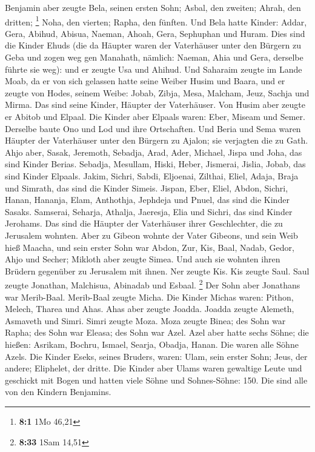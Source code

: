  Benjamin aber zeugte Bela, seinen ersten Sohn; Asbal, den
zweiten; Ahrah, den dritten; \footnote{\textbf{8:1} 1Mo 46,21}
 Noha, den vierten; Rapha, den fünften.  Und
Bela hatte Kinder: Addar, Gera, Abihud,  Abisua, Naeman,
Ahoah,  Gera, Sephuphan und Huram.  Dies
sind die Kinder Ehuds (die da Häupter waren der Vaterhäuser unter den
Bürgern zu Geba und zogen weg gen Manahath,  nämlich:
Naeman, Ahia und Gera, derselbe führte sie weg): und er zeugte Usa und
Ahihud.  Und Saharaim zeugte im Lande Moab, da er von sich
gelassen hatte seine Weiber Husim und Baara,  und er
zeugte von Hodes, seinem Weibe: Jobab, Zibja, Mesa, Malcham,
 Jeuz, Sachja und Mirma. Das sind seine Kinder, Häupter
der Vaterhäuser.  Von Husim aber zeugte er Abitob und
Elpaal.  Die Kinder aber Elpaals waren: Eber, Miseam und
Semer. Derselbe baute Ono und Lod und ihre Ortschaften. 
Und Beria und Sema waren Häupter der Vaterhäuser unter den Bürgern zu
Ajalon; sie verjagten die zu Gath.  Ahjo aber, Sasak,
Jeremoth,  Sebadja, Arad, Ader,  Michael,
Jispa und Joha, das sind Kinder Berias.  Sebadja,
Mesullam, Hiski, Heber,  Jismerai, Jislia, Jobab, das
sind Kinder Elpaals.  Jakim, Sichri, Sabdi,
 Eljoenai, Zilthai, Eliel,  Adaja, Braja
und Simrath, das sind die Kinder Simeis.  Jispan, Eber,
Eliel,  Abdon, Sichri, Hanan,  Hananja,
Elam, Anthothja,  Jephdeja und Pnuel, das sind die Kinder
Sasaks.  Samserai, Seharja, Athalja, 
Jaeresja, Elia und Sichri, das sind Kinder Jerohams.  Das
sind die Häupter der Vaterhäuser ihrer Geschlechter, die zu Jerusalem
wohnten.  Aber zu Gibeon wohnte der Vater Gibeons, und
sein Weib hieß Maacha,  und sein erster Sohn war Abdon,
Zur, Kis, Baal, Nadab,  Gedor, Ahjo und Secher;
 Mikloth aber zeugte Simea. Und auch sie wohnten ihren
Brüdern gegenüber zu Jerusalem mit ihnen.  Ner zeugte
Kis. Kis zeugte Saul. Saul zeugte Jonathan, Malchisua, Abinadab und
Esbaal. \footnote{\textbf{8:33} 1Sam 14,51}  Der Sohn
aber Jonathans war Merib-Baal. Merib-Baal zeugte Micha. 
Die Kinder Michas waren: Pithon, Melech, Tharea und Ahas.
 Ahas aber zeugte Joadda. Joadda zeugte Alemeth, Asmaveth
und Simri. Simri zeugte Moza.  Moza zeugte Binea; des
Sohn war Rapha; des Sohn war Eleasa; des Sohn war Azel. 
Azel aber hatte sechs Söhne; die hießen: Asrikam, Bochru, Ismael,
Searja, Obadja, Hanan. Die waren alle Söhne Azels.  Die
Kinder Eseks, seines Bruders, waren: Ulam, sein erster Sohn; Jeus, der
andere; Eliphelet, der dritte.  Die Kinder aber Ulams
waren gewaltige Leute und geschickt mit Bogen und hatten viele Söhne und
Sohnes-Söhne: 150. Die sind alle von den Kindern Benjamins.


